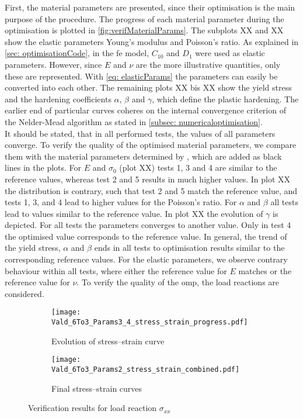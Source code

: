 First, the material parameters are presented, since their optimisation is the main purpose of the procedure. The progress of each material parameter during the optimisation is plotted in \autoref{fig:verifMaterialParams}. The subplots XX and XX show the elastic parameters Young's modulus and Poisson's ratio. As explained in \autoref{sec: optimisationCode}, in the \acrshort{fe} model, $C_{10}$ and $D_1$ were used as elastic parameters. However, since $E$ and $\nu$ are the more illustrative quantities, only these are represented. With \autoref{eq: elasticParams} the parameters can easily be converted into each other.
The remaining plots XX bis XX show the  yield stress and the hardening coefficients $\alpha$, $\beta$ and $\gamma$, which define the plastic hardening.
The earlier end of particular curves coheres on the internal convergence criterion of the Nelder-Mead algorithm as stated in \autoref{subsec: numericaloptimisation}. \\
\indent It should be stated, that in all performed tests, the values of all parameters converge. 
To verify the quality of the optimised material parameters, we compare them with the material parameters determined by \citet{ries_deciphering_nodate}, which are added as black lines in the plots. 
For $E$ and $\sigma_0$ (plot XX) tests 1, 3 and 4 are similar to the reference values, whereas test 2 and 5 results in much higher values.
In plot XX the distribution is contrary, such that test 2 and 5 match the reference value, and tests 1, 3, and 4 lead to higher values for the Poisson's ratio.
For $\alpha$ and $\beta$ all tests lead to values similar to the reference value.
In plot XX the evolution of $\gamma$ is depicted. For all tests the parameters converges to another value. Only in test 4 the optimised value corresponds to the reference value. 
In general, the trend of the yield stress, $\alpha$ and $\beta$ ends in all tests to optimisation results similar to the corresponding reference values. For the elastic parameters, we observe contrary behaviour within all tests, where either the reference value for $E$ matches or the reference value for $\nu$. To verify the quality of the \acrlong{omp}, the load reactions are considered. 

\begin{figure}[H]
\centering
\begin{subfigure}[t]{0.495\textwidth}
    \centering
    \texttt{[image: Vald\_6To3\_Params3\_4\_stress\_strain\_progress.pdf]}
    \caption{Evolution of stress–strain curve}
    \label{fig:verifStressStrainProgress}
\end{subfigure}
\hfill
\begin{subfigure}[t]{0.495\textwidth}
    \centering
    \texttt{[image: Vald\_6To3\_Params2\_stress\_strain\_combined.pdf]}
    \caption{Final stress–strain curves}
    \label{fig:verifStressStrainFinal}
\end{subfigure}
\caption{Verification results for load reaction $\sigma_{xx}$}
\label{fig:verifStressStrainCurves}
\end{figure}

